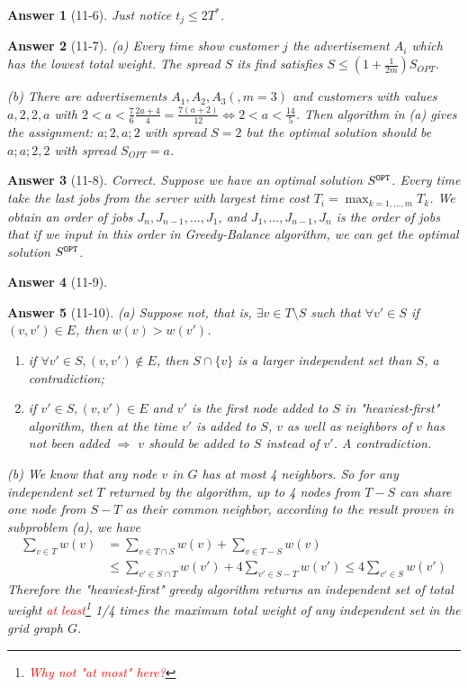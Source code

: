 \documentclass[11pt]{article}
\theoremstyle{numberplain}
\theoremstyle{nonumberplain}
\newtheorem{ans}{Answer}
\newcommand{\0}{{\mathbf{0}}}
\begin{document}
\begin{ans}[11-6] Just notice $t_j\leq 2T^*$. 
\end{ans}

\begin{ans}[11-7] (a) Every time show customer $j$ the advertisement $A_i$ which has the lowest total weight. The spread $S$ its find satisfies $S\leq \left(1+\frac{1}{2m}\right)S_{OPT}$.

(b) There are advertisements $A_1, A_2, A_3 (,m=3)$ and customers with values $a,2,2,a$ with $2<a<\frac{7}{6}\frac{2a+4}{4}=\frac{7(a+2)}{12}\Leftrightarrow 2<a<\frac{14}{5}$. Then algorithm in (a) gives the assignment:
$a;2,a;2$ with spread $S=2$ but the optimal solution should be $a;a;2,2$ with spread $S_{OPT}=a$.

\end{ans}

\begin{ans}[11-8] Correct. Suppose we have an optimal solution $S^{\tt OPT}$. Every time take the last jobs from the server with largest time cost $T_i=\max_{k=1,\ldots,m}T_k$. We obtain an order of jobs $J_n,J_{n-1},\ldots, J_1$, and $J_1,\ldots,J_{n-1}, J_n$ is the order of jobs that if we input in this order in Greedy-Balance algorithm, we can get the optimal solution $S^{\tt OPT}$.
\end{ans}

\begin{ans}[11-9]
\end{ans}

\begin{ans}[11-10] (a) Suppose not, that is, $\exists v\in T\setminus S$ such that $\forall v'\in S$ if $(v,v')\in E$, then $w(v)> w(v')$.


 \begin{enumerate}
 \item if $\forall v'\in S,(v,v')\notin E$, then $S\cap \{v\}$ is a larger independent set than $S$, a contradiction;

 \item if $v'\in S, (v,v')\in E $ and $v'$ is the first node added to $S$ in "heaviest-first" algorithm, then at the time $v'$ is added to $S$, $v$ as well as neighbors of $v$ has not been added $\Rightarrow$ $v$ should be added to $S$ instead of $v'$. A contradiction.
 \end{enumerate} 

(b) We know that any node $v$ in $G$ has at most 4 neighbors. So for any independent set $T$ returned by the algorithm, up to 4 nodes from $T-S$ can share one node from $S-T$ as their common neighbor, according to the result proven in subproblem (a), we have
\begin{align}
\nonumber\sum_{v\in T}w(v) & =\sum_{v\in T\cap S}w(v)+\sum_{v\in T-S}w(v)\\
& \le \sum_{v'\in S\cap T}w(v')+4\sum_{v'\in S-T}w(v')\le 4\sum_{v'\in S}w(v')
\end{align}
Therefore the "heaviest-first" greedy algorithm returns an independent
set of total weight \textcolor{red}{at least}\footnote{\textcolor{red}{Why not "at most" here?}} 1/4 times the maximum total weight of
any independent set in the grid graph $G$.


\end{ans}
\end{document}
